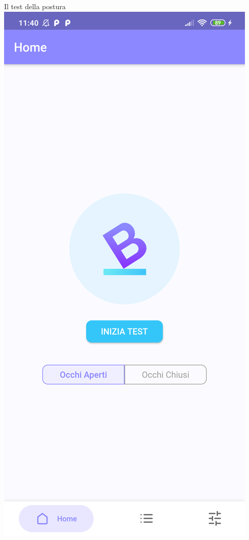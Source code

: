 \documentclass{beamer}
\begin{document}
    \begin{frame}{Il test della postura}
        \centering
        \includegraphics[scale=0.09]{../figures/screenshot/redmi_note_8t/home.png}
    \end{frame}
\end{document}
